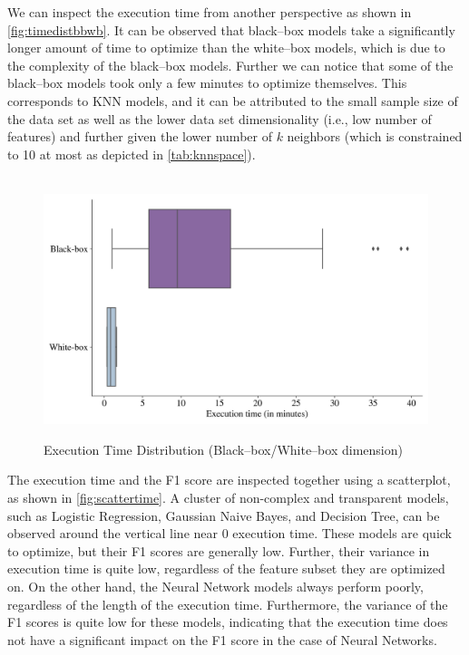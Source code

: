 \newpage
We can inspect the execution time from another perspective as shown in \autoref{fig:timedistbbwb}.
It can be observed that black--box models take a significantly longer amount of time to optimize than the white--box models, which is due to the complexity of the black--box models.
Further we can notice that some of the black--box models took only a few minutes to optimize themselves. This corresponds to KNN models, and it can be attributed to the small sample size of the data set as well as the lower data set dimensionality (i.e., low number of features) and further given the lower number of $k$ neighbors (which is constrained to 10 at most as depicted in \autoref{tab:knnspace}).
\begin{figure}[H]
    \centering
    \caption{Execution Time Distribution (Black--box/White--box dimension)}\vspace{0.5em}
    \label{fig:timedistbbwb}\
    \includegraphics[width=140mm]{Figures/EXECUTION_TIME_Distribution_BB_WB.jpg}

    \vspace{-1em}
\end{figure}

\newpage

The execution time and the F1 score are inspected together using a scatterplot, as shown in \autoref{fig:scattertime}. 
A cluster of non-complex and transparent models, such as Logistic Regression, Gaussian Naive Bayes, and Decision Tree, can be observed around the vertical line near 0 execution time. These models are quick to optimize, but their F1 scores are generally low.
Further, their variance in execution time is quite low, regardless of the feature subset they are optimized on.
On the other hand, the Neural Network models always perform poorly, regardless of the length of the execution time. Furthermore, the variance of the F1 scores is quite low for these models, indicating that the execution time does not have a significant impact on the F1 score in the case of Neural Networks.


